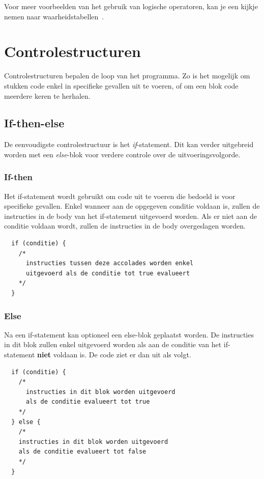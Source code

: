 \documentclass[11pt,fleqn]{book} %
\begin{document}
\noindent Voor meer voorbeelden van het gebruik van logische operatoren, kan je een kijkje nemen naar waarheidstabellen~\cite{wiki:Waarheidstabel}.


\chapter{Controlestructuren}
Controlestructuren bepalen de loop van het programma. Zo is het mogelijk om stukken code enkel in specifieke gevallen uit te voeren, of om een blok code meerdere keren te herhalen.
\section{If-then-else}
De eenvoudigste controlestructuur is het \emph{if}-statement. Dit kan verder uitgebreid worden met een \emph{else}-blok voor verdere controle over de uitvoeringsvolgorde.

\subsection{If-then}
Het if-statement wordt gebruikt om code uit te voeren die bedoeld is voor specifieke gevallen. Enkel wanneer aan de opgegeven conditie voldaan is, zullen de instructies in de body van het if-statement uitgevoerd worden. Als er niet aan de conditie voldaan wordt, zullen de instructies in de body overgeslagen worden.

\begin{definition}[If]
	\phantom{ }
	\begin{verbatim}
  if (conditie) {
    /*
      instructies tussen deze accolades worden enkel 
      uitgevoerd als de conditie tot true evalueert
    */
  }
	\end{verbatim}
	\vspace{0cm}
\end{definition}

\pagebreak

\subsection{Else}
Na een if-statement kan optioneel een else-blok geplaatst worden. De instructies in dit blok zullen enkel uitgevoerd worden als aan de conditie van het if-statement \textbf{niet} voldaan is. De code ziet er dan uit als volgt.

\begin{definition}
	\phantom{ }
	\begin{verbatim}
  if (conditie) {
    /*
      instructies in dit blok worden uitgevoerd 
      als de conditie evalueert tot true
    */
  } else {
    /*
    instructies in dit blok worden uitgevoerd 
    als de conditie evalueert tot false
    */
  }
	\end{verbatim}
\end{definition}
\end{document}
